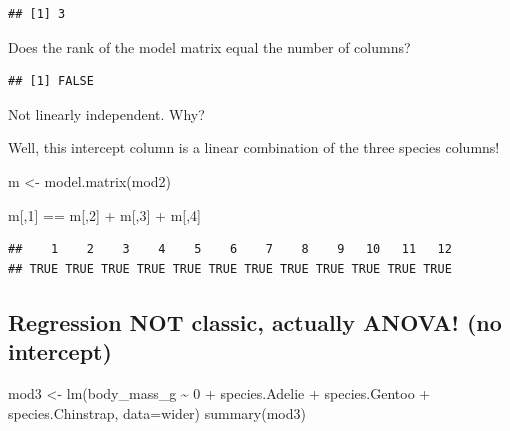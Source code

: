 \documentclass[
]{book}
\newenvironment{Shaded}{\begin{snugshade}}{\end{snugshade}}
\newcommand{\AttributeTok}[1]{\textcolor[rgb]{0.77,0.63,0.00}{#1}}
\newcommand{\DecValTok}[1]{\textcolor[rgb]{0.00,0.00,0.81}{#1}}
\newcommand{\FunctionTok}[1]{\textcolor[rgb]{0.00,0.00,0.00}{#1}}
\newcommand{\NormalTok}[1]{#1}
\newcommand{\OtherTok}[1]{\textcolor[rgb]{0.56,0.35,0.01}{#1}}
\newcommand{\SpecialCharTok}[1]{\textcolor[rgb]{0.00,0.00,0.00}{#1}}
\begin{document}
\begin{verbatim}
## [1] 3
\end{verbatim}

Does the rank of the model matrix equal the number of columns?

\begin{Shaded}
\end{Shaded}

\begin{verbatim}
## [1] FALSE
\end{verbatim}

Not linearly independent. Why?

Well, this intercept column is a linear combination of the three species columns!

\begin{Shaded}
\begin{Highlighting}[]
\NormalTok{m }\OtherTok{\textless{}{-}} \FunctionTok{model.matrix}\NormalTok{(mod2)}

\NormalTok{m[,}\DecValTok{1}\NormalTok{] }\SpecialCharTok{==}\NormalTok{ m[,}\DecValTok{2}\NormalTok{] }\SpecialCharTok{+}\NormalTok{ m[,}\DecValTok{3}\NormalTok{] }\SpecialCharTok{+}\NormalTok{ m[,}\DecValTok{4}\NormalTok{]}
\end{Highlighting}
\end{Shaded}

\begin{verbatim}
##    1    2    3    4    5    6    7    8    9   10   11   12 
## TRUE TRUE TRUE TRUE TRUE TRUE TRUE TRUE TRUE TRUE TRUE TRUE
\end{verbatim}

\hypertarget{regression-not-classic-actually-anova-no-intercept}{%
\subsection{Regression NOT classic, actually ANOVA! (no intercept)}\label{regression-not-classic-actually-anova-no-intercept}}

\begin{Shaded}
\begin{Highlighting}[]
\NormalTok{mod3 }\OtherTok{\textless{}{-}} \FunctionTok{lm}\NormalTok{(body\_mass\_g }\SpecialCharTok{\textasciitilde{}} \DecValTok{0} \SpecialCharTok{+}\NormalTok{ species.Adelie }\SpecialCharTok{+}\NormalTok{ species.Gentoo }\SpecialCharTok{+}\NormalTok{ species.Chinstrap, }\AttributeTok{data=}\NormalTok{wider)}
\FunctionTok{summary}\NormalTok{(mod3)}
\end{Highlighting}
\end{Shaded}
\end{document}

